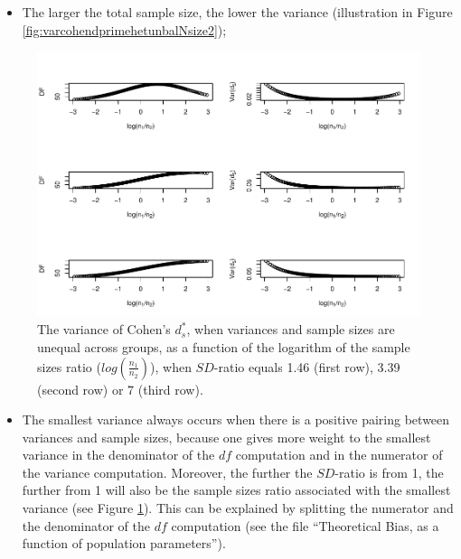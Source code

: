 \documentclass[
  english,
  man,mask]{apa6}
\providecommand{\tightlist}{%
  \setlength{\itemsep}{0pt}\setlength{\parskip}{0pt}}
\begin{document}
\begin{itemize}
\tightlist
\item
  The larger the total sample size, the lower the variance (illustration in Figure \ref{fig:varcohendprimehetunbalNsize2});
\end{itemize}

\begin{figure}
\centering
\includegraphics{Theoretical-Variance-of-all-estimators-as-a-function-of-population-parameters_files/figure-latex/varcohendprimehetunbalnratiosdratio2-1.pdf}
\caption{\label{fig:varcohendprimehetunbalnratiosdratio2}The variance of Cohen's \(d^*_s\), when variances and sample sizes are unequal across groups, as a function of the logarithm of the sample sizes ratio (\(log \left( \frac{n_1}{n_2} \right)\)), when \(SD\)-ratio equals 1.46 (first row), 3.39 (second row) or 7 (third row).}
\end{figure}

\begin{itemize}
\tightlist
\item
  The smallest variance always occurs when there is a positive pairing between variances and sample sizes, because one gives more weight to the smallest variance in the denominator of the \(df\) computation and in the numerator of the variance computation. Moreover, the further the \(SD\)-ratio is from 1, the further from 1 will also be the sample sizes ratio associated with the smallest variance (see Figure \ref{fig:varcohendprimehetunbalnratiosdratio2}). This can be explained by splitting the numerator and the denominator of the \(df\) computation (see the file \enquote{Theoretical Bias, as a function of population parameters}).
\end{itemize}
\end{document}
